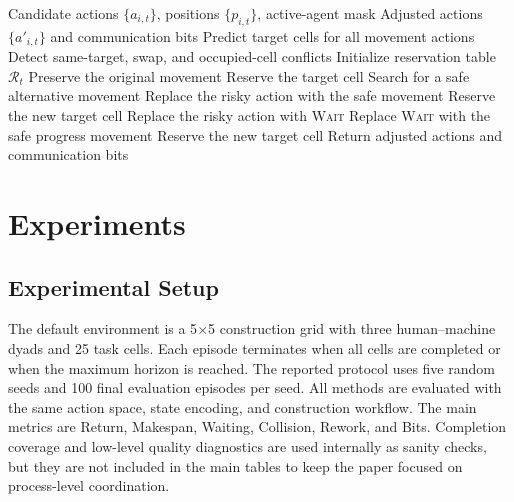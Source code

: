 \documentclass[preprint,12pt]{elsarticle}
\begin{document}
\begin{algorithm}[htbp]
\caption{Task-Progress Reservation Shield}
\label{alg:shield}
\begin{algorithmic}[1]
\REQUIRE Candidate actions $\{a_{i,t}\}$, positions $\{p_{i,t}\}$, active-agent mask
\ENSURE Adjusted actions $\{a'_{i,t}\}$ and communication bits
\STATE Predict target cells for all movement actions
\STATE Detect same-target, swap, and occupied-cell conflicts
\STATE Initialize reservation table $\mathcal{R}_t$
    \STATE Preserve the original movement
    \STATE Reserve the target cell
\ENDFOR
{}
    \STATE Search for a safe alternative movement
        \STATE Replace the risky action with the safe movement
        \STATE Reserve the new target cell
    \ELSE
        \STATE Replace the risky action with \textsc{Wait}
    \ENDIF
\ENDFOR
{}
        \STATE Replace \textsc{Wait} with the safe progress movement
        \STATE Reserve the new target cell
    \ENDIF
\ENDFOR
\STATE Return adjusted actions and communication bits
\end{algorithmic}
\end{algorithm}


\section{Experiments}

\subsection{Experimental Setup}

The default environment is a 5$\times$5 construction grid with three human--machine dyads and 25 task cells. Each episode terminates when all cells are completed or when the maximum horizon is reached. The reported protocol uses five random seeds and 100 final evaluation episodes per seed. All methods are evaluated with the same action space, state encoding, and construction workflow. The main metrics are Return, Makespan, Waiting, Collision, Rework, and Bits. Completion coverage and low-level quality diagnostics are used internally as sanity checks, but they are not included in the main tables to keep the paper focused on process-level coordination.
\end{document}
